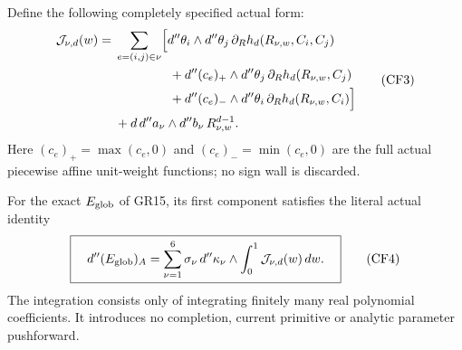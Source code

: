 Define the following completely specified actual form:
\[
\begin{split}
 \mathcal J_{\nu,d}(w)
  ={}&\sum_{e=(i,j)\in\nu}\Bigl[
       d''\theta_i\wedge d''\theta_j\,
          \partial_Rh_d(R_{\nu,w},C_i,C_j)\\
 &\hspace{15mm}+d''(c_e)_+\wedge d''\theta_j\,
          \partial_Rh_d(R_{\nu,w},C_j)\\
 &\hspace{15mm}+d''(c_e)_-\wedge d''\theta_i\,
          \partial_Rh_d(R_{\nu,w},C_i)\Bigr]\\
 &+d\,d''a_\nu\wedge d''b_\nu\,R_{\nu,w}^{d-1}.
\end{split}
 \tag{CF3}
\]
Here $(c_e)_+=\max(c_e,0)$ and $(c_e)_-=\min(c_e,0)$ are
the full actual piecewise affine unit-weight functions; no sign
wall is discarded.

\begin{proposition}
For the exact $E_{\rm glob}$ of GR15, its first component satisfies
the literal actual identity
\[
 \boxed{\quad
 d''(E_{\rm glob})_A
   =\sum_{\nu=1}^6\sigma_\nu\,
      d''\kappa_\nu\wedge\int_0^1\mathcal J_{\nu,d}(w)\,dw.
 \quad}
 \tag{CF4}
\]
The integration consists only of integrating finitely many real
polynomial coefficients.  It introduces no completion, current
primitive or analytic parameter pushforward.
\end{proposition}

